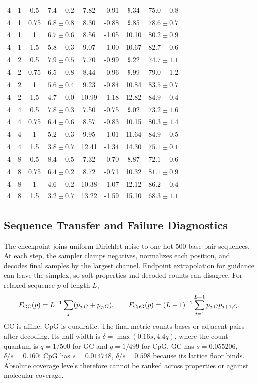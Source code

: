 \documentclass{article}
\begin{document}
\begin{table}[!htbp]
\begin{tabular}{cccccccc}
4 & 1 & 0.5 & $7.4\pm0.2$ & 7.82 & -0.91 & 9.34 & $75.0\pm0.8$\\
4 & 1 & 0.75 & $6.8\pm0.8$ & 8.30 & -0.88 & 9.85 & $78.6\pm0.7$\\
4 & 1 & 1 & $6.7\pm0.6$ & 8.56 & -1.05 & 10.10 & $80.2\pm0.9$\\
4 & 1 & 1.5 & $5.8\pm0.3$ & 9.07 & -1.00 & 10.67 & $82.7\pm0.6$\\
4 & 2 & 0.5 & $7.9\pm0.5$ & 7.70 & -0.99 & 9.22 & $74.7\pm1.1$\\
4 & 2 & 0.75 & $6.5\pm0.8$ & 8.44 & -0.96 & 9.99 & $79.0\pm1.2$\\
4 & 2 & 1 & $5.6\pm0.4$ & 9.23 & -0.84 & 10.84 & $83.5\pm0.7$\\
4 & 2 & 1.5 & $4.7\pm0.0$ & 10.99 & -1.18 & 12.82 & $84.9\pm0.4$\\
4 & 4 & 0.5 & $7.8\pm0.3$ & 7.50 & -0.75 & 9.02 & $73.2\pm1.6$\\
4 & 4 & 0.75 & $6.4\pm0.6$ & 8.57 & -0.83 & 10.15 & $80.3\pm1.4$\\
4 & 4 & 1 & $5.2\pm0.3$ & 9.95 & -1.01 & 11.64 & $84.9\pm0.5$\\
4 & 4 & 1.5 & $3.8\pm0.7$ & 12.41 & -1.34 & 14.30 & $75.1\pm0.1$\\
4 & 8 & 0.5 & $8.4\pm0.5$ & 7.32 & -0.70 & 8.87 & $72.1\pm0.6$\\
4 & 8 & 0.75 & $6.4\pm0.2$ & 8.72 & -0.71 & 10.32 & $81.1\pm0.9$\\
4 & 8 & 1 & $4.6\pm0.2$ & 10.38 & -1.07 & 12.12 & $86.2\pm0.4$\\
4 & 8 & 1.5 & $3.2\pm0.7$ & 13.22 & -1.59 & 15.10 & $68.3\pm1.1$\\
\bottomrule
\end{tabular}
\end{table}
\clearpage

\subsection{Sequence Transfer and Failure Diagnostics}\label{app:m2}
The checkpoint joins uniform Dirichlet noise to one-hot 500-base-pair sequences. At each step, the sampler clamps negatives, normalizes each position, and decodes final samples by the largest channel. Endpoint extrapolation for guidance can leave the simplex, so soft properties and decoded counts can disagree. For relaxed sequence $p$ of length $L$,
\[
 F_{\rm GC}(p)=L^{-1}\sum_j(p_{j,C}+p_{j,G}),\qquad
 F_{\rm CpG}(p)=(L-1)^{-1}\sum_{j=1}^{L-1}p_{j,C}p_{j+1,G}.
\]
GC is affine; CpG is quadratic. The final metric counts bases or adjacent pairs after decoding. Its half-width is $\delta=\max(0.16s,4.4q)$, where the count quantum is $q=1/500$ for GC and $q=1/499$ for CpG. GC has $s=0.055206$, $\delta/s=0.160$; CpG has $s=0.014748$, $\delta/s=0.598$ because its lattice floor binds. Absolute coverage levels therefore cannot be ranked across properties or against molecular coverage.
\end{document}
